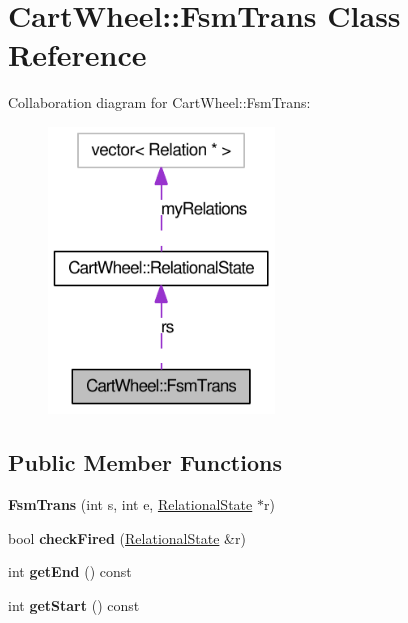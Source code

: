 \hypertarget{classCartWheel_1_1FsmTrans}{
\section{CartWheel::FsmTrans Class Reference}
\label{classCartWheel_1_1FsmTrans}
}


Collaboration diagram for CartWheel::FsmTrans:\nopagebreak
\begin{figure}[H]
\begin{center}
\leavevmode
\includegraphics[width=170pt]{classCartWheel_1_1FsmTrans__coll__graph}
\end{center}
\end{figure}
\subsection*{Public Member Functions}
\begin{DoxyCompactItemize}
\item 
\hypertarget{classCartWheel_1_1FsmTrans_a4949f41be704e491a18773c216e80ad1}{
{\bfseries FsmTrans} (int s, int e, \hyperlink{classCartWheel_1_1RelationalState}{RelationalState} $\ast$r)}
\label{classCartWheel_1_1FsmTrans_a4949f41be704e491a18773c216e80ad1}

\item 
\hypertarget{classCartWheel_1_1FsmTrans_a2e728f51c6d449b0eaaffdb3ef91c9b7}{
bool {\bfseries checkFired} (\hyperlink{classCartWheel_1_1RelationalState}{RelationalState} \&r)}
\label{classCartWheel_1_1FsmTrans_a2e728f51c6d449b0eaaffdb3ef91c9b7}

\item 
\hypertarget{classCartWheel_1_1FsmTrans_ae8947e72edc880e338cb42959e352dc7}{
int {\bfseries getEnd} () const }
\label{classCartWheel_1_1FsmTrans_ae8947e72edc880e338cb42959e352dc7}

\item 
\hypertarget{classCartWheel_1_1FsmTrans_a6837bd427f373e46dc25482798e30d33}{
int {\bfseries getStart} () const }
\label{classCartWheel_1_1FsmTrans_a6837bd427f373e46dc25482798e30d33}

\end{DoxyCompactItemize}

